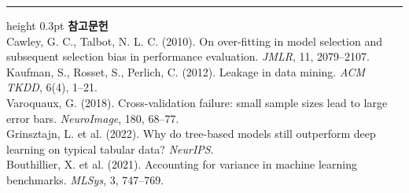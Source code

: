 \documentclass[10pt]{article}
\begin{document}
\vspace{0.6em}
\hrule height 0.3pt
\vspace{0.5em}
{\footnotesize
\textbf{참고문헌}\\[0.3em]
Cawley, G. C., Talbot, N. L. C. (2010). On over-fitting in model selection and
subsequent selection bias in performance evaluation. \emph{JMLR}, 11, 2079--2107.\\[0.15em]
Kaufman, S., Rosset, S., Perlich, C. (2012). Leakage in data mining.
\emph{ACM TKDD}, 6(4), 1--21.\\[0.15em]
Varoquaux, G. (2018). Cross-validation failure: small sample sizes lead to large
error bars. \emph{NeuroImage}, 180, 68--77.\\[0.15em]
Grinsztajn, L. et al. (2022). Why do tree-based models still outperform deep
learning on typical tabular data? \emph{NeurIPS}.\\[0.15em]
Bouthillier, X. et al. (2021). Accounting for variance in machine learning
benchmarks. \emph{MLSys}, 3, 747--769.
}
\end{document}
